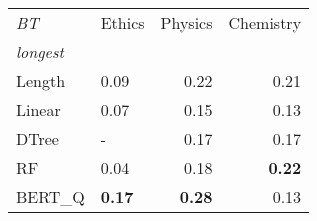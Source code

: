 \begin{tabular}{llrr}
\toprule
\textit{BT} & Ethics &  Physics &  Chemistry \\
\textit{longest}  &        &          &            \\
\midrule
Length &   0.09 &     0.22 &       0.21 \\
Linear &   0.07 &     0.15 &       0.13 \\
DTree  &      - &     0.17 &       0.17 \\
RF     &   0.04 &     0.18 &       \textbf{0.22} \\
BERT\_Q &   \textbf{0.17} &     \textbf{0.28} &       0.13 \\
\bottomrule
\end{tabular}
